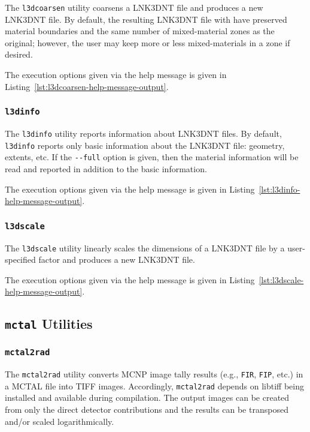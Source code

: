 \documentclass[11pt]{article}
\begin{document}
The \texttt{l3dcoarsen} utility coarsens a LNK3DNT file and produces a new
LNK3DNT file. By default, the resulting LNK3DNT file with have preserved
material boundaries and the same number of mixed-material zones as the original;
however, the user may keep more or less mixed-materials in a zone if desired.

The execution options given via the help message is given in
Listing~\ref{lst:l3dcoarsen-help-message-output}.

\subsubsection{\texttt{l3dinfo}}\label{sec:l3dinfo}

The \texttt{l3dinfo} utility reports information about LNK3DNT files. By
default, \texttt{l3dinfo} reports only basic information about the LNK3DNT file:
geometry, extents, etc. If the \texttt{-\/-full} option is given, then the
material information will be read and reported in addition to the basic
information.

The execution options given via the help message is given in
Listing~\ref{lst:l3dinfo-help-message-output}.

\subsubsection{\texttt{l3dscale}}\label{sec:l3dscale}

The \texttt{l3dscale} utility linearly scales the dimensions of a
LNK3DNT file by a user-specified factor and produces a new LNK3DNT file.

The execution options given via the help message is given in
Listing~\ref{lst:l3dscale-help-message-output}.

\subsection{\texttt{mctal} Utilities}

\subsubsection{\texttt{mctal2rad}}\label{sec:mctal2rad}

The \texttt{mctal2rad} utility converts MCNP image tally results (e.g.,
\texttt{FIR}, \texttt{FIP}, etc.) in a MCTAL file into TIFF images.
Accordingly, \texttt{mctal2rad} depends on libtiff being installed and available
during compilation. The output images can be created from only the direct
detector contributions and the results can be transposed and/or scaled
logarithmically.
\end{document}
